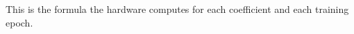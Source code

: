 \documentclass[preview]{standalone}
\begin{document}
\begin{center}
This is the formula the hardware computes for each coefficient and each training epoch.
\end{center}
\end{document}
